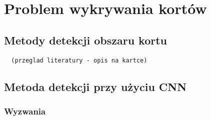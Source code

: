 \chapter{Problem wykrywania kortów}

\section{Metody detekcji obszaru kortu}

\begin{verbatim}
  (przeglad literatury - opis na kartce)
\end{verbatim}

\section{Metoda detekcji przy użyciu CNN}

\subsection{Wyzwania}
